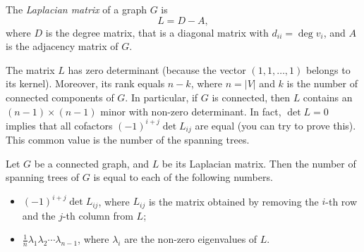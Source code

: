 \begin{page}
\setcounter{section}{2}
\setcounter{subsection}{5}
\setcounter{dfn}{14}
\label{portion:253}

\begin{dfn}
The \emph{Laplacian matrix} of a graph $G$ is
\[
L = D - A,
\]
where $D$ is the degree matrix, that is a diagonal matrix with $d_{ii} = \deg v_i$, and $A$ is the adjacency matrix of $G$.
\end{dfn}

\end{page}

\begin{page}
\setcounter{section}{2}
\setcounter{subsection}{5}
\setcounter{dfn}{14}
\label{portion:254}


The matrix $L$ has zero determinant (because the vector $(1, 1, \ldots, 1)$ belongs to its kernel).
Moreover, its rank equals $n-k$, where $n = |V|$ and $k$ is the number of connected components of $G$.
In particular, if $G$ is connected, then $L$ contains an $(n-1) \times (n-1)$ minor with non-zero determinant.
In fact, $\det L = 0$ implies that all cofactors $(-1)^{i+j} \det L_{ij}$ are equal (you can try to prove this).
This common value is the number of the spanning trees.


\end{page}

\begin{page}
\setcounter{section}{2}
\setcounter{subsection}{5}
\setcounter{dfn}{15}
\label{portion:256}

\begin{thm}[Kirchhoff]
Let $G$ be a connected graph, and $L$ be its Laplacian matrix.
Then the number of spanning trees of $G$ is equal to each of the following numbers.
\begin{itemize}
\item $(-1)^{i+j} \det L_{ij}$, where $L_{ij}$ is the matrix obtained by removing the $i$-th row and the $j$-th column from $L$;
\item $\frac{1}{n} \lambda_1 \lambda_2 \cdots \lambda_{n-1}$, where $\lambda_i$ are the non-zero eigenvalues of $L$.
\end{itemize}
\end{thm}

\end{page}

